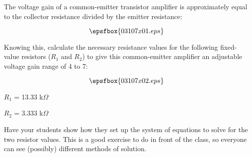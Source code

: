 

The voltage gain of a common-emitter transistor amplifier is approximately equal to the collector resistance divided by the emitter resistance:

$$\epsfbox{03107x01.eps}$$

Knowing this, calculate the necessary resistance values for the following fixed-value resistors ($R_1$ and $R_2$) to give this common-emitter amplifier an adjustable voltage gain range of 4 to 7:

$$\epsfbox{03107x02.eps}$$







$R_1$ = 13.33 k$\Omega$

\vskip 10pt

$R_2$ = 3.333 k$\Omega$







Have your students show how they set up the system of equations to solve for the two resistor values.  This is a good exercise to do in front of the class, so everyone can see (possibly) different methods of solution.




